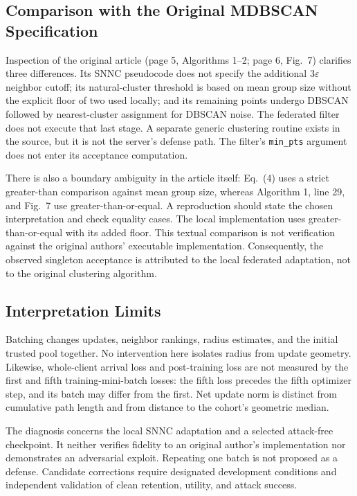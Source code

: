 \documentclass[journal]{IEEEtran}
\begin{document}
\subsection{Comparison with the Original MDBSCAN Specification}
Inspection of the original article (page 5, Algorithms 1--2; page 6, Fig.~7) clarifies three differences. Its SNNC pseudocode does not specify the additional $3\varepsilon$ neighbor cutoff; its natural-cluster threshold is based on mean group size without the explicit floor of two used locally; and its remaining points undergo DBSCAN followed by nearest-cluster assignment for DBSCAN noise. The federated filter does not execute that last stage. A separate generic clustering routine exists in the source, but it is not the server's defense path. The filter's \texttt{min\_pts} argument does not enter its acceptance computation.

There is also a boundary ambiguity in the article itself: Eq.~(4) uses a strict greater-than comparison against mean group size, whereas Algorithm 1, line 29, and Fig.~7 use greater-than-or-equal. A reproduction should state the chosen interpretation and check equality cases. The local implementation uses greater-than-or-equal with its added floor. This textual comparison is not verification against the original authors' executable implementation. Consequently, the observed singleton acceptance is attributed to the local federated adaptation, not to the original clustering algorithm.

\subsection{Interpretation Limits}
Batching changes updates, neighbor rankings, radius estimates, and the initial trusted pool together. No intervention here isolates radius from update geometry. Likewise, whole-client arrival loss and post-training loss are not measured by the first and fifth training-mini-batch losses: the fifth loss precedes the fifth optimizer step, and its batch may differ from the first. Net update norm is distinct from cumulative path length and from distance to the cohort's geometric median.

The diagnosis concerns the local SNNC adaptation and a selected attack-free checkpoint. It neither verifies fidelity to an original author's implementation nor demonstrates an adversarial exploit. Repeating one batch is not proposed as a defense. Candidate corrections require designated development conditions and independent validation of clean retention, utility, and attack success.
\end{document}
